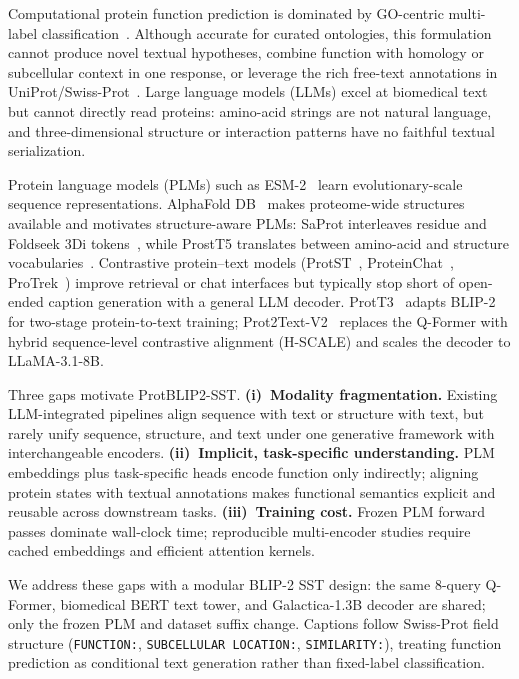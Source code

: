 \documentclass[conference]{IEEEtran}
\begin{document}
Computational protein function prediction is dominated by GO-centric multi-label classification~\cite{gene2023go,zhou2019cafa,oliveira2023temprot}.
Although accurate for curated ontologies, this formulation cannot produce novel textual hypotheses, combine function with homology or subcellular context in one response, or leverage the rich free-text annotations in UniProt/Swiss-Prot~\cite{bairoch2000swissprot,uniprot2023}.
Large language models (LLMs) excel at biomedical text~\cite{zhou2024LLMcomprehensive,taylor2022galactica} but cannot directly read proteins: amino-acid strings are not natural language, and three-dimensional structure or interaction patterns have no faithful textual serialization.

Protein language models (PLMs) such as ESM-2~\cite{lin2023esm2} learn evolutionary-scale sequence representations.
AlphaFold DB~\cite{varadi2022alphafolddb} makes proteome-wide structures available and motivates structure-aware PLMs: SaProt interleaves residue and Foldseek 3Di tokens~\cite{su2023saprot,vankempen2024foldseek}, while ProstT5 translates between amino-acid and structure vocabularies~\cite{heinzinger2024prostt5}.
Contrastive protein--text models (ProtST~\cite{xu2023protst}, ProteinChat~\cite{guo2023proteinchat}, ProTrek~\cite{su2025protrek}) improve retrieval or chat interfaces but typically stop short of open-ended caption generation with a general LLM decoder.
ProtT3~\cite{liu2024prott3} adapts BLIP-2~\cite{li2023blip2} for two-stage protein-to-text training; Prot2Text-V2~\cite{fei2025prot2text} replaces the Q-Former with hybrid sequence-level contrastive alignment (H-SCALE) and scales the decoder to LLaMA-3.1-8B.

Three gaps motivate ProtBLIP2-SST.
\textbf{(i)~Modality fragmentation.} Existing LLM-integrated pipelines align sequence with text or structure with text, but rarely unify sequence, structure, and text under one generative framework with interchangeable encoders.
\textbf{(ii)~Implicit, task-specific understanding.} PLM embeddings plus task-specific heads encode function only indirectly; aligning protein states with textual annotations makes functional semantics explicit and reusable across downstream tasks.
\textbf{(iii)~Training cost.} Frozen PLM forward passes dominate wall-clock time; reproducible multi-encoder studies require cached embeddings and efficient attention kernels.

We address these gaps with a modular BLIP-2 SST design: the same 8-query Q-Former, biomedical BERT text tower, and Galactica-1.3B decoder are shared; only the frozen PLM and dataset suffix change.
Captions follow Swiss-Prot field structure (\texttt{FUNCTION:}, \texttt{SUBCELLULAR LOCATION:}, \texttt{SIMILARITY:}), treating function prediction as conditional text generation rather than fixed-label classification.
\end{document}

